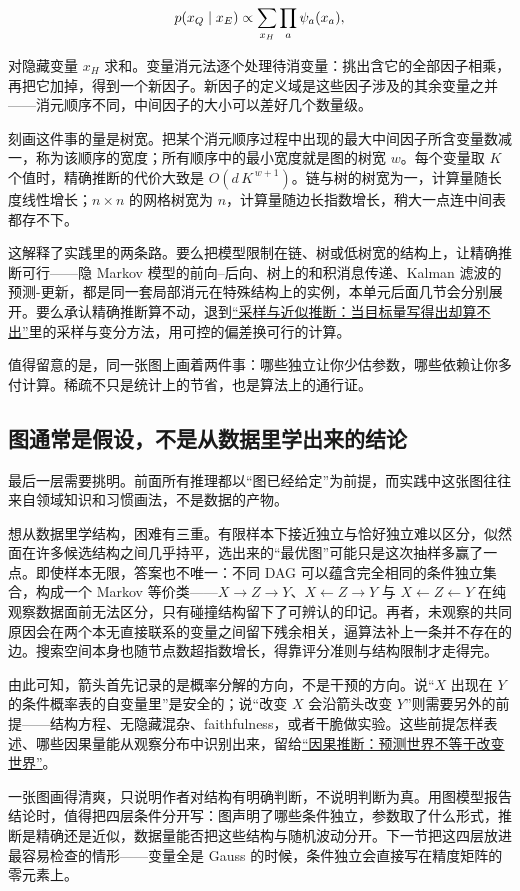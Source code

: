 \[
p(x_Q\mid x_E)\propto\sum_{x_H}\prod_a \psi_a(x_a),
\]

对隐藏变量 \(x_H\) 求和。变量消元法逐个处理待消变量：挑出含它的全部因子相乘，再把它加掉，得到一个新因子。新因子的定义域是这些因子涉及的其余变量之并——消元顺序不同，中间因子的大小可以差好几个数量级。

刻画这件事的量是树宽。把某个消元顺序过程中出现的最大中间因子所含变量数减一，称为该顺序的宽度；所有顺序中的最小宽度就是图的树宽 \(w\)。每个变量取 \(K\) 个值时，精确推断的代价大致是 \(O(d\,K^{\,w+1})\)。链与树的树宽为一，计算量随长度线性增长；\(n\times n\) 的网格树宽为 \(n\)，计算量随边长指数增长，稍大一点连中间表都存不下。

这解释了实践里的两条路。要么把模型限制在链、树或低树宽的结构上，让精确推断可行——隐 Markov 模型的前向--后向、树上的和积消息传递、Kalman 滤波的预测-更新，都是同一套局部消元在特殊结构上的实例，本单元后面几节会分别展开。要么承认精确推断算不动，退到\hyperref[ch:116]{``采样与近似推断：当目标量写得出却算不出''}里的采样与变分方法，用可控的偏差换可行的计算。

值得留意的是，同一张图上画着两件事：哪些独立让你少估参数，哪些依赖让你多付计算。稀疏不只是统计上的节省，也是算法上的通行证。

\subsection{图通常是假设，不是从数据里学出来的结论}

最后一层需要挑明。前面所有推理都以``图已经给定''为前提，而实践中这张图往往来自领域知识和习惯画法，不是数据的产物。

想从数据里学结构，困难有三重。有限样本下接近独立与恰好独立难以区分，似然面在许多候选结构之间几乎持平，选出来的``最优图''可能只是这次抽样多赢了一点。即使样本无限，答案也不唯一：不同 DAG 可以蕴含完全相同的条件独立集合，构成一个 Markov 等价类——\(X\to Z\to Y\)、\(X\leftarrow Z\to Y\) 与 \(X\leftarrow Z\leftarrow Y\) 在纯观察数据面前无法区分，只有碰撞结构留下了可辨认的印记。再者，未观察的共同原因会在两个本无直接联系的变量之间留下残余相关，逼算法补上一条并不存在的边。搜索空间本身也随节点数超指数增长，得靠评分准则与结构限制才走得完。

由此可知，箭头首先记录的是概率分解的方向，不是干预的方向。说``\(X\) 出现在 \(Y\) 的条件概率表的自变量里''是安全的；说``改变 \(X\) 会沿箭头改变 \(Y\)''则需要另外的前提——结构方程、无隐藏混杂、faithfulness，或者干脆做实验。这些前提怎样表述、哪些因果量能从观察分布中识别出来，留给\hyperref[ch:120]{``因果推断：预测世界不等于改变世界''}。

一张图画得清爽，只说明作者对结构有明确判断，不说明判断为真。用图模型报告结论时，值得把四层条件分开写：图声明了哪些条件独立，参数取了什么形式，推断是精确还是近似，数据量能否把这些结构与随机波动分开。下一节把这四层放进最容易检查的情形——变量全是 Gauss 的时候，条件独立会直接写在精度矩阵的零元素上。
